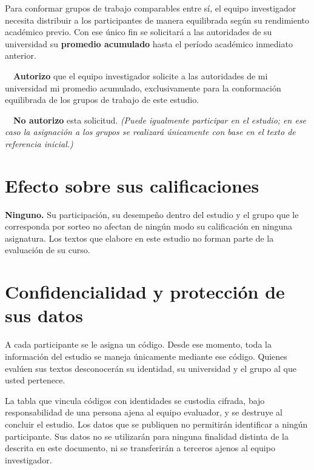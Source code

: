 \documentclass[10.5pt,a4paper]{article}
\newenvironment{recuadro}
	{\begin{lrbox}{\cajaguardada}\begin{minipage}{\dimexpr\textwidth-2\fboxsep\relax}\vspace{4pt}\small}
	{\vspace{4pt}\end{minipage}\end{lrbox}\par\vspace{4pt}\noindent\colorbox{grisclaro}{\usebox{\cajaguardada}}\par\vspace{6pt}}
\newcommand{\casilla}{\fbox{\rule{0pt}{7pt}\rule{7pt}{0pt}}}
\begin{document}
Para conformar grupos de trabajo comparables entre s\'i, el equipo investigador necesita distribuir a los participantes de manera equilibrada seg\'un su rendimiento acad\'emico previo. Con ese \'unico fin se solicitar\'a a las autoridades de su universidad su \textbf{promedio acumulado} hasta el per\'iodo acad\'emico inmediato anterior.

\begin{recuadro}
\casilla\ \ \textbf{Autorizo} que el equipo investigador solicite a las autoridades de mi universidad mi promedio acumulado, exclusivamente para la conformaci\'on equilibrada de los grupos de trabajo de este estudio.

\vspace{5pt}
\casilla\ \ \textbf{No autorizo} esta solicitud. \textit{(Puede igualmente participar en el estudio; en ese caso la asignaci\'on a los grupos se realizar\'a \'unicamente con base en el texto de referencia inicial.)}
\end{recuadro}

\section{Efecto sobre sus calificaciones}

\textbf{Ninguno.} Su participaci\'on, su desempe\~no dentro del estudio y el grupo que le corresponda por sorteo no afectan de ning\'un modo su calificaci\'on en ninguna asignatura. Los textos que elabore en este estudio no forman parte de la evaluaci\'on de su curso.

\section{Confidencialidad y protecci\'on de sus datos}

A cada participante se le asigna un c\'odigo. Desde ese momento, toda la informaci\'on del estudio se maneja \'unicamente mediante ese c\'odigo. Quienes eval\'uen sus textos desconocer\'an su identidad, su universidad y el grupo al que usted pertenece.

La tabla que vincula c\'odigos con identidades se custodia cifrada, bajo responsabilidad de una persona ajena al equipo evaluador, y se destruye al concluir el estudio. Los datos que se publiquen no permitir\'an identificar a ning\'un participante. Sus datos no se utilizar\'an para ninguna finalidad distinta de la descrita en este documento, ni se transferir\'an a terceros ajenos al equipo investigador.
\end{document}
